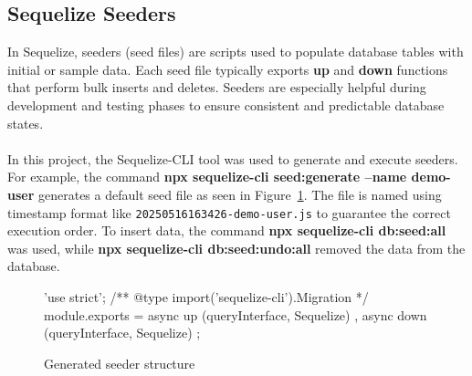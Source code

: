 \documentclass[a4paper,12pt]{report}
\begin{document}
\subsection{Sequelize Seeders}
In Sequelize, seeders (seed files) are scripts used to populate database tables with initial or sample data. Each seed file typically exports \textbf{up} and \textbf{down} functions that perform bulk inserts and deletes. Seeders are especially helpful during development and testing phases to ensure consistent and predictable database states. \parencite{sequelizemigrations}\\\\
In this project, the Sequelize-CLI tool was used to generate and execute seeders. For example, the command \textbf{npx sequelize-cli seed:generate --name demo-user} generates a default seed file as seen in Figure~\ref{fig:generated_seeder}. The file is named using timestamp format like \texttt{20250516163426-demo-user.js} to guarantee the correct execution order. To insert data, the command \textbf{npx sequelize-cli db:seed:all} was used, while \textbf{npx sequelize-cli db:seed:undo:all} removed the data from the database.
\begin{figure}[H]
	\begin{code}
		'use strict';
		/** @type {import('sequelize-cli').Migration} */
		module.exports = {
			async up (queryInterface, Sequelize) {
			},
			async down (queryInterface, Sequelize) {
			}
		};
	\end{code}
	\caption{Generated seeder structure}
	\label{fig:generated_seeder}
\end{figure}
\end{document}
